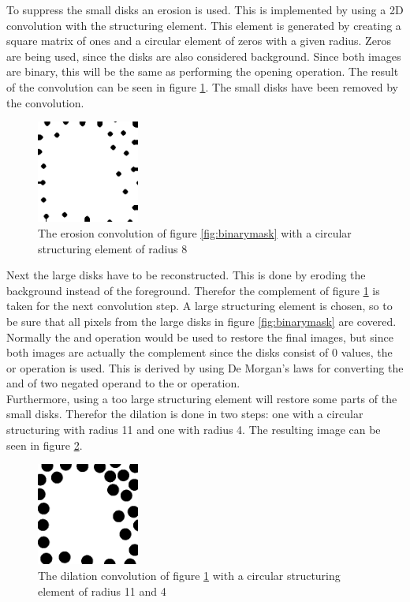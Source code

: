\documentclass[a4paper]{article}
\begin{document}
\noindent To suppress the small disks an erosion is used. This is implemented by using a 2D convolution with the structuring element.
This element is generated by creating a square matrix of ones and a circular element of zeros with a given radius.
Zeros are being used, since the disks are also considered background.
Since both images are binary, this will be the same as performing the opening operation. The result of the 
convolution can be seen in figure \ref{fig:convolution}. The small disks have been removed by the convolution.

\begin{figure}[H]
  \centering
  \includegraphics[width=0.3\textwidth]{../lab4ex3/convolution.png} 
  \caption{The erosion convolution of figure \ref{fig:binarymask} with a circular structuring element of radius 8}
  \label{fig:convolution}
\end{figure}





\newpage

\noindent Next the large disks have to be reconstructed.
This is done by eroding the background instead of the foreground.
Therefor the complement of figure \ref{fig:convolution} is taken for the next convolution step.
A large structuring element is chosen, so to be sure that all pixels from the large disks in figure \ref{fig:binarymask} are covered.
Normally the and operation would be used to restore the final images, but since both images are actually the complement since
the disks consist of 0 values, the or operation is used.
This is derived by using De Morgan's laws for converting the and of two negated operand to the or operation.\\

\noindent Furthermore, using a too large structuring element will restore some parts of the small disks.
Therefor the dilation is done in two steps: one with a circular structuring with radius 11 and one with radius 4.
The resulting image can be seen in figure \ref{fig:restored}.

\begin{figure}[H]
  \centering
  \includegraphics[width=0.3\textwidth]{../lab4ex3/restored.png} 
  \caption{The dilation convolution of figure \ref{fig:convolution} with a circular structuring element of radius 11 and 4}
  \label{fig:restored}
\end{figure}
\end{document}

